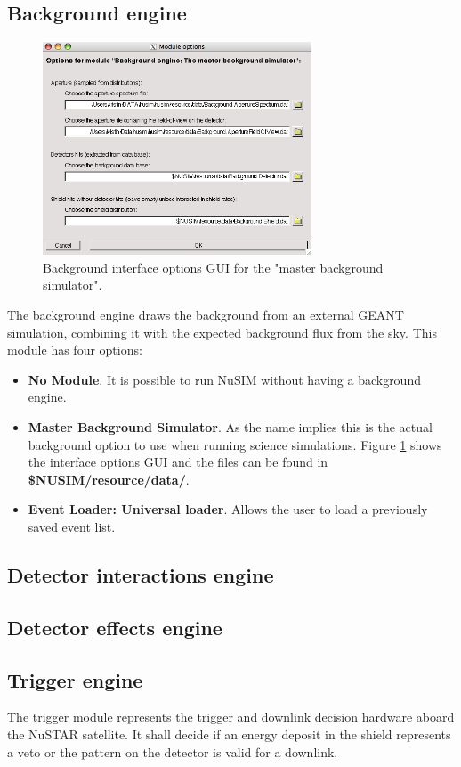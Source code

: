 \subsection{Background engine}
\begin{figure}[tb]
\begin{center}
\includegraphics[width=8cm]{images/backgroundgui.png}  
\caption{Background interface options GUI for the "master background simulator".}
\label{bkggui} 
\end{center}
\end{figure}
The background engine draws the background from an external GEANT simulation, combining it with the expected background flux from the sky. This module has four options:
\begin{itemize}
\item \textbf{No Module}. It is possible to run NuSIM without having a background engine.
\item \textbf{Master Background Simulator}. As the name implies this is the actual background option to use when running science simulations. Figure \ref{bkggui} shows the interface options GUI and the files can be found in \textbf{\${NUSIM}/resource/data/}.
\item \textbf{Event Loader: Universal loader}. Allows the user to load a previously saved event list.
\end{itemize}
\subsection{Detector interactions engine}

\subsection{Detector effects engine}

\subsection{Trigger engine}
The trigger module represents the trigger and downlink decision hardware aboard the NuSTAR satellite. It shall decide if an energy deposit in the shield represents a veto or the pattern on the detector is valid for a downlink.

